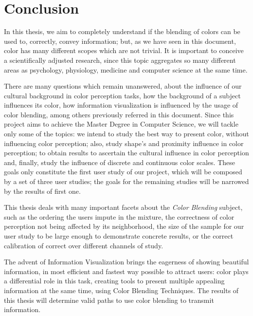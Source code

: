 \documentclass{report}
\begin{document}
\chapter{Conclusion}
In this thesis, we aim to completely understand if the blending of colors can be used to, correctly, convey information; but, as we have seen in this
document, color has many different scopes which are not trivial. It is important to conceive a scientifically adjusted research, since this topic
aggregates so many different areas as psychology, physiology, medicine and computer science at the same time. \par
There are many questions which remain unanswered, about the influence of our cultural background in color perception tasks, how the background of a subject influences its color, how information visualization is influenced by the usage of color blending, among others previously referred in this document. Since this project aims to achieve the Master Degree in Computer Science, we will tackle only some of the topics: we intend to study the best way to present color, without influencing color perception; also, study shape's and proximity influence in color perception; to obtain results to ascertain the cultural influence in color perception and, finally, study the influence of discrete and continuous color scales. These goals only constitute the first user study of our project, which will be composed by a set of three user studies; the goals for the remaining studies will be narrowed by the results of first one. \par
This thesis deals with many important facets about the \emph{Color Blending} subject, such as the ordering the users impute in the mixture, the
correctness of color perception not being affected by its neighborhood, the size of the sample for our user study to be large enough to demonstrate
concrete results, or the correct calibration of correct over different channels of study. \par
The advent of Information Visualization brings the eagerness of showing beautiful information, in most efficient and fastest way possible to attract
users: color plays a differential role in this task, creating tools to present multiple appealing information at the same time, using Color Blending
Techniques. The results of this thesis will determine valid paths to use color blending to transmit information.
%
%



\end{document}
